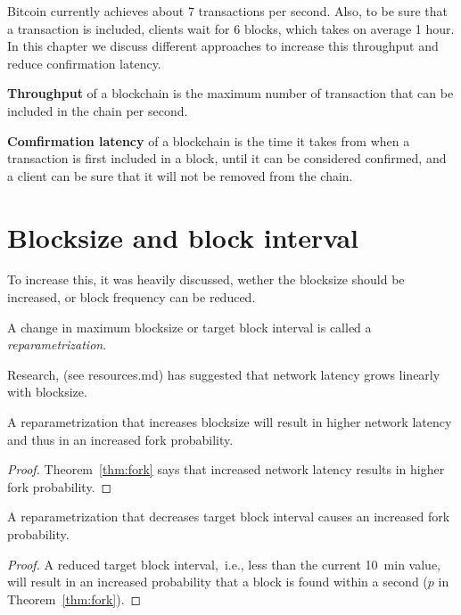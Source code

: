 
Bitcoin currently achieves about 7 transactions per second. 
Also, to be sure that a transaction is included, clients wait for 6 blocks, which takes 
on average 1 hour.
In this chapter we discuss different approaches to increase this throughput and reduce confirmation latency.

\begin{definition} \textbf{Throughput} of a blockchain is the maximum number of transaction that can be included in the chain per second.
\end{definition}

\begin{definition} \textbf{Comfirmation latency} of a blockchain is the time it takes from when a transaction is first included in a block, until it can be considered confirmed, and a client can be sure that it will not be removed from the chain.
\end{definition}

\section{Blocksize and block interval}
To increase this, it was heavily discussed, wether the blocksize should be increased, or block frequency can be reduced.

\begin{definition} A change in maximum blocksize or target block interval is called a \emph{reparametrization}.
\end{definition}

Research, (see resources.md) has suggested that network latency grows linearly with blocksize.
\begin{lem} 
	A reparametrization that increases blocksize will result in higher network latency and thus in an increased fork probability.
\end{lem}
\begin{proof}
Theorem~\ref{thm:fork} says that increased network latency results in higher fork probability.	
\end{proof}

\begin{lem}
	A reparametrization that decreases target block interval causes an increased fork probability.
\end{lem}
\begin{proof}
A reduced target block interval,~i.e., less than the current 10~min value, will result in an increased probability that a block is found within a second ($p$ in Theorem~\ref{thm:fork}).
\end{proof}

